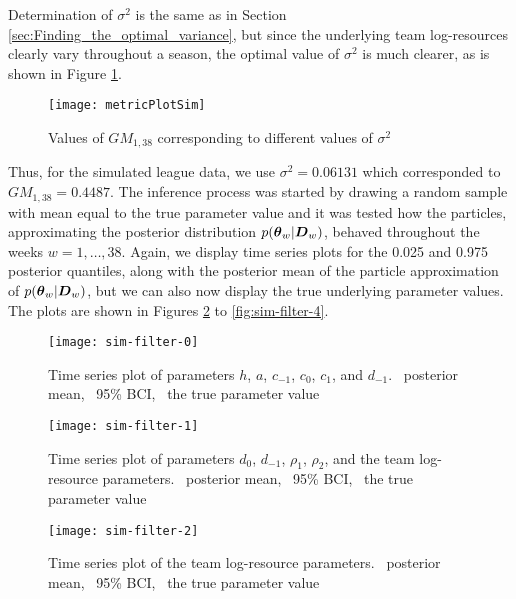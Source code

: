 Determination of \(\sigma^2\) is the same as in Section \ref{sec:Finding_the_optimal_variance}, but since the underlying
team log-resources clearly vary throughout a season, the optimal value of \(\sigma^2\) is much clearer, as is shown in
Figure \ref{fig:metricPlotSim}.
\begin{figure}[htp]
\begin{center}
\texttt{[image: metricPlotSim]}
\caption{Values of \(GM_{1, 38}\) corresponding to different values of \(\sigma^2\)}
\label{fig:metricPlotSim}
\end{center}
\end{figure}
Thus, for the simulated league data, we use \(\sigma^2 = 0.06131\) which corresponded to \(GM_{1, 38} = 0.4487\). The
inference process was started by drawing a random sample with mean equal to the true parameter value and it was tested how the
particles, approximating the posterior distribution \(p(\boldsymbol{\theta}_w | \boldsymbol{D}_w)\), behaved throughout the weeks \(w = 1,
\ldots, 38\). Again, we display time series plots for the 0.025 and 0.975 posterior quantiles, along with the posterior
mean of the particle approximation of \(p(\boldsymbol{\theta}_w | \boldsymbol{D}_w)\), but we can also now display the true underlying
parameter values. The plots are shown in Figures \ref{fig:sim-filter-0} to \ref{fig:sim-filter-4}.
\begin{figure}[htp]
\begin{center}
\texttt{[image: sim-filter-0]}
\caption{Time series plot of parameters \(h\), \(a\), \(c_{-1}\), \(c_0\), \(c_{1}\), and \(d_{-1}\).
\protect\redSolidLine\ posterior mean, \protect\blackDashedLine\ 95\% BCI, \protect\greenSolidLine\ the true parameter
value}
\label{fig:sim-filter-0}
\end{center}
\end{figure}
%
\begin{figure}[htp]
\begin{center}
\texttt{[image: sim-filter-1]}
\caption{Time series plot of parameters \(d_0\), \(d_{-1}\), \(\rho_1\), \(\rho_2\), and the team log-resource
parameters. \protect\redSolidLine\ posterior mean, \protect\blackDashedLine\ 95\% BCI, \protect\greenSolidLine\ the true
parameter value}
\label{fig:sim-filter-3}
\end{center}
\end{figure}
%
\begin{figure}[htp]
\begin{center}
\texttt{[image: sim-filter-2]}
\caption{Time series plot of the team log-resource parameters. \protect\redSolidLine\ posterior mean,
\protect\blackDashedLine\ 95\% BCI, \protect\greenSolidLine\ the true parameter value}
\label{fig:sim-filter-2}
\end{center}
\end{figure}
